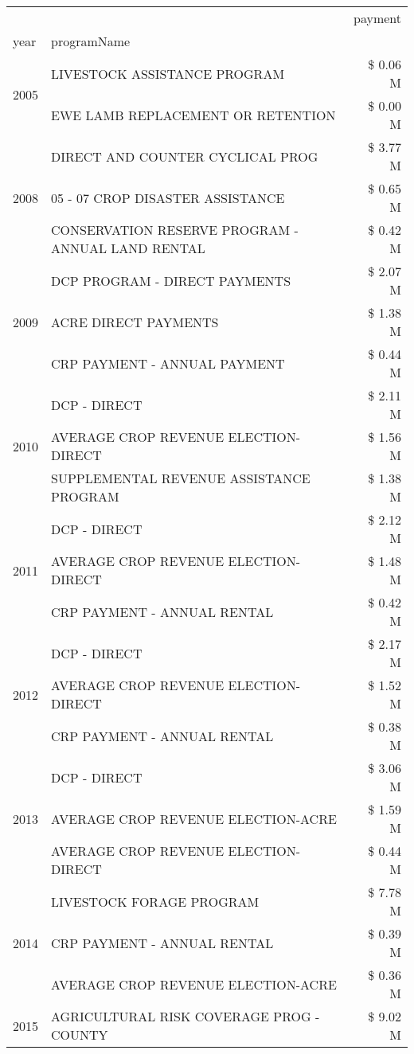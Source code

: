 \begin{tabular}{llr}
\toprule
 &  & payment \\
year & programName &  \\
\midrule
\multirow[t]{2}{*}{2005} & LIVESTOCK ASSISTANCE PROGRAM & \$ 0.06 M \\
 & EWE LAMB REPLACEMENT OR RETENTION & \$ 0.00 M \\
\cline{1-3}
\multirow[t]{3}{*}{2008} & DIRECT AND COUNTER CYCLICAL PROG & \$ 3.77 M \\
 & 05 - 07 CROP DISASTER ASSISTANCE & \$ 0.65 M \\
 & CONSERVATION RESERVE PROGRAM - ANNUAL LAND RENTAL & \$ 0.42 M \\
\cline{1-3}
\multirow[t]{3}{*}{2009} & DCP PROGRAM - DIRECT PAYMENTS & \$ 2.07 M \\
 & ACRE DIRECT PAYMENTS & \$ 1.38 M \\
 & CRP PAYMENT - ANNUAL PAYMENT & \$ 0.44 M \\
\cline{1-3}
\multirow[t]{3}{*}{2010} & DCP - DIRECT & \$ 2.11 M \\
 & AVERAGE CROP REVENUE ELECTION-DIRECT & \$ 1.56 M \\
 & SUPPLEMENTAL REVENUE ASSISTANCE PROGRAM & \$ 1.38 M \\
\cline{1-3}
\multirow[t]{3}{*}{2011} & DCP - DIRECT & \$ 2.12 M \\
 & AVERAGE CROP REVENUE ELECTION-DIRECT & \$ 1.48 M \\
 & CRP PAYMENT - ANNUAL RENTAL & \$ 0.42 M \\
\cline{1-3}
\multirow[t]{3}{*}{2012} & DCP - DIRECT & \$ 2.17 M \\
 & AVERAGE CROP REVENUE ELECTION-DIRECT & \$ 1.52 M \\
 & CRP PAYMENT - ANNUAL RENTAL & \$ 0.38 M \\
\cline{1-3}
\multirow[t]{3}{*}{2013} & DCP - DIRECT & \$ 3.06 M \\
 & AVERAGE CROP REVENUE ELECTION-ACRE & \$ 1.59 M \\
 & AVERAGE CROP REVENUE ELECTION-DIRECT & \$ 0.44 M \\
\cline{1-3}
\multirow[t]{3}{*}{2014} & LIVESTOCK FORAGE PROGRAM & \$ 7.78 M \\
 & CRP PAYMENT - ANNUAL RENTAL & \$ 0.39 M \\
 & AVERAGE CROP REVENUE ELECTION-ACRE & \$ 0.36 M \\
\cline{1-3}
\multirow[t]{3}{*}{2015} & AGRICULTURAL RISK COVERAGE PROG - COUNTY & \$ 9.02 M \\

\end{tabular}
